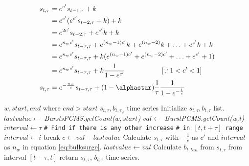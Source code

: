 \begin{equation}
\label{eq:bulksurge}
        \begin{split}
                s_{t,\tau} &= e^{c'} s_{t-1,\tau} + k \\
                           &= e^{c'} (e^{c'} s_{t-2,\tau} +k ) + k \\
                           &= e^{2c'} s_{t-2,\tau} + e^{c'}k + k \\
                           &= e^{n_wc'} s_{t-\tau,\tau} + e^{(n_w-1)c'}k + e^{(n_w-2)}k + \ldots + e^{c'}k + k \\
                           &= e^{n_wc'} s_{t-\tau,\tau} + k (e^{(n_w-1)c'} + e^{(n_w-2)c'}+ \ldots + e^{c'} +1)\\
                           &= e^{n_wc'} s_{t-\tau,\tau} + k \frac{1}{1-e^{c'}} ~~~~~~~~~~~~~~~~ [\because  1 < c' < 1 ]\\
                s_{t,\tau} &= e^{-\frac{n_w}{c}} s_{t-\tau,\tau} + (1-\alphastar)\frac{1}{\tau} \frac{1}{1-e^{-\frac{1}{c}}} \\
        \end{split}
\end{equation}

\begin{algorithm}
        \caption{\emph{$\mathbb{Q}1_{w,[start,end]}$ }}
        \label{algo:query1approach1}
\begin{algorithmic} 
\REQUIRE $w, start, end$ where $end > start$ 
\ENSURE $s_{t,\tau}, b_{t,\tau_w}$ time series
\STATE
\STATE Initialize $s_{t,\tau},b_{t,\tau}$ list.
\STATE $lastvalue \leftarrow$ \emph{BurstsPCMS.getCount($w,start$)}
\STATE $val \leftarrow$ \emph{BurstPCMS.getCount(w,t)}
        \STATE $interval \leftarrow \tau$
        \STATE \texttt{\# Find if there is any other increase}
        \STATE \texttt{\# in $[t,t+\tau]$ range }
                        \STATE $interval \leftarrow i$
                        \STATE break
                        \ENDIF
                \ENDFOR
                \ENDIF
                \STATE $c \leftarrow val - lastvalue$
                \STATE Calculate $s_{t,\tau}$ with $-\frac{1}{c}$ as $c'$ and $interval$ as $n_w$ in equation \ref{eq:bulksurge}.  
                \STATE $lastvalue \leftarrow val$
                \STATE Calculate $b_{t,tau}$ from $s_{t,\tau}$ from interval $[t-\tau,t]$
        \ENDIF
\ENDFOR
\STATE return $s_{t,\tau}$, $b_{t,\tau}$ time series. 
\end{algorithmic}
\end{algorithm}

